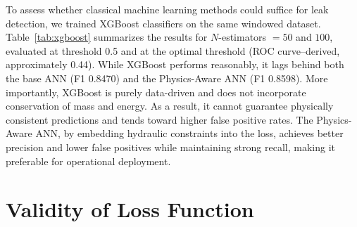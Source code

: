 \documentclass[final,5p,times,twocolumn,authoryear]{elsarticle}
\begin{document}
To assess whether classical machine learning methods could suffice for leak detection, we trained XGBoost classifiers on the same windowed dataset. Table~\ref{tab:xgboost} summarizes the results for $N$-estimators $= 50$ and $100$, evaluated at threshold 0.5 and at the optimal threshold (ROC curve–derived, approximately 0.44). While XGBoost performs reasonably, it lags behind both the base ANN (F1 0.8470) and the Physics-Aware ANN (F1 0.8598). More importantly, XGBoost is purely data-driven and does not incorporate conservation of mass and energy. As a result, it cannot guarantee physically consistent predictions and tends toward higher false positive rates. The Physics-Aware ANN, by embedding hydraulic constraints into the loss, achieves better precision and lower false positives while maintaining strong recall, making it preferable for operational deployment.

\begin{table}[H]
\centering
\caption{XGBoost on LeakDB Hanoi. $N$: trees; Thr.: threshold. ROC-AUC: 0.8705 ($N$=50), 0.8752 ($N$=100).}
\label{tab:xgboost}
\small
{}
\end{table}

\section{Validity of Loss Function}
\end{document}
